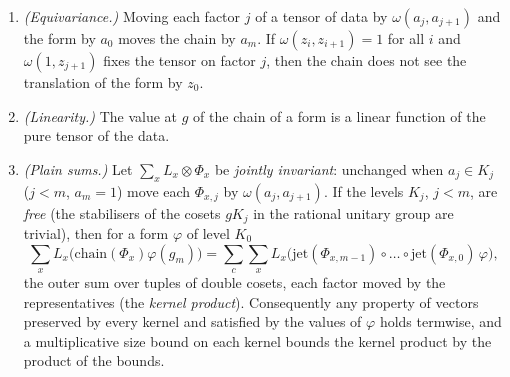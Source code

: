 \begin{proposition}[Chains]\label{prop:chains}
\begin{enumerate}[label=\textup{(\alph*)}]
\item \emph{(Equivariance.)} Moving each factor $j$ of a tensor of data by $\omega(a_j,a_{j+1})$ and the form by
$a_0$ moves the chain by $a_m$. If $\omega(z_i,z_{i+1})=1$ for all $i$ and $\omega(1,z_{j+1})$ fixes the tensor
on factor $j$, then the chain does not see the translation of the form by $z_0$.
\item \emph{(Linearity.)} The value at $g$ of the chain of a form is a linear function of the pure tensor of the
data.
\item \emph{(Plain sums.)} Let $\sum_xL_x\otimes\Phi_x$ be \emph{jointly invariant}: unchanged when $a_j\in K_j$
($j<m$, $a_m=1$) move each $\Phi_{x,j}$ by $\omega(a_j,a_{j+1})$. If the levels $K_j$, $j<m$, are \emph{free}
(the stabilisers of the cosets $gK_j$ in the rational unitary group are trivial), then for a form $\varphi$ of
level $K_0$
\[
  \sum_xL_x\bigl(\mathrm{chain}(\Phi_x)\varphi(g_m)\bigr)
  =\sum_{c}\sum_xL_x\bigl(\mathrm{jet}(\Phi_{x,m-1})\circ\dots\circ\mathrm{jet}(\Phi_{x,0})\,\varphi\bigr),
\]
the outer sum over tuples of double cosets, each factor moved by the representatives (the \emph{kernel
product}). Consequently any property of vectors preserved by every kernel and satisfied by the values of
$\varphi$ holds termwise, and a multiplicative size bound on each kernel bounds the kernel product by the product
of the bounds.
\end{enumerate}
\end{proposition}

